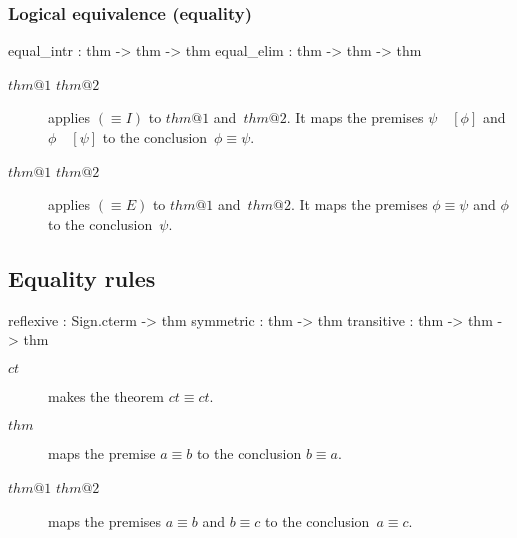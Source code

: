 \subsubsection{Logical equivalence (equality)}
\begin{ttbox} 
equal_intr : thm -> thm -> thm equal_elim : thm -> thm -> thm
\end{ttbox}
\begin{description}
\item[ $thm@1$ $thm@2$] 
applies $({\equiv}I)$ to $thm@1$ and~$thm@2$.  It maps the premises
$\psi\quad[\phi]$ and $\phi\quad[\psi]$ to the conclusion~$\phi\equiv\psi$.

\item[ $thm@1$ $thm@2$] 
applies $({\equiv}E)$ to $thm@1$ and~$thm@2$.  It maps the premises
$\phi\equiv\psi$ and $\phi$ to the conclusion~$\psi$.
\end{description}


\subsection{Equality rules}
\begin{ttbox} 
reflexive  : Sign.cterm -> thm
symmetric  : thm -> thm
transitive : thm -> thm -> thm
\end{ttbox}
\begin{description}
\item[ $ct$] 
makes the theorem \(ct\equiv ct\). 

\item[ $thm$] 
maps the premise $a\equiv b$ to the conclusion $b\equiv a$.

\item[ $thm@1$ $thm@2$] 
maps the premises $a\equiv b$ and $b\equiv c$ to the conclusion~${a\equiv c}$.
\end{description}


